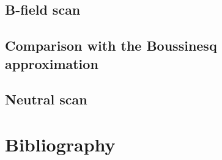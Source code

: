 \documentclass[12pt,a4paper,oneside,openright]{report} %
\begin{document}
\chapter{B-field scan}
\label{chap:BFScan}

\chapter{Comparison with the Boussinesq approximation}
\label{chap:compBouss}

\chapter{Neutral scan}
\label{chap:neutScan}


\part{Bibliography}


\end{document}
